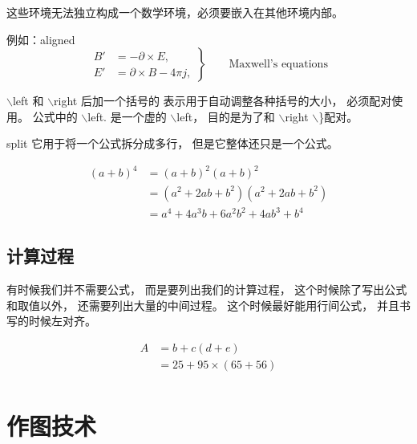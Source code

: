 \documentclass[b5paper,UTF8]{book}
\begin{document}
这些环境无法独立构成一个数学环境，必须要嵌入在其他环境内部。

例如：aligned
\begin{equation}
 \left.\begin{aligned}
        B'&=-\partial \times E,\\
        E'&=\partial \times B - 4\pi j,
       \end{aligned}
 \right\}
 \qquad \text{Maxwell's equations}
\end{equation}

$\backslash$left
和
$\backslash$right
后加一个括号的
表示用于自动调整各种括号的大小，
必须配对使用。
公式中的
$\backslash$left. 
是一个虚的
$\backslash$left，
目的是为了和
$\backslash$right
$\backslash$\}配对。

split
它用于将一个公式拆分成多行，
但是它整体还只是一个公式。

\begin{equation}
\begin{split}
(a + b)^4
&= (a + b)^2 (a + b)^2      \\
&= (a^2 + 2ab + b^2)(a^2 + 2ab + b^2)  \\
&= a^4 + 4a^3b + 6a^2b^2 + 4ab^3 + b^4
\end{split}
\end{equation}



\section{计算过程}

有时候我们并不需要公式，
而是要列出我们的计算过程，
这个时候除了写出公式和取值以外，
还需要列出大量的中间过程。
这个时候最好能用行间公式，
并且书写的时候左对齐。



\begin{align*}
    A &= b + c(d + e) \\
    &= 25 + 95 \times (65 + 56)  \\
\end{align*}













\chapter{作图技术}
\end{document}
